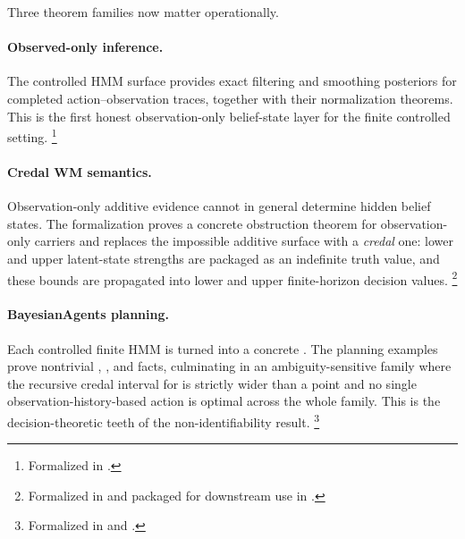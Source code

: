 \documentclass[11pt,openany]{report}
\begin{document}
Three theorem families now matter operationally.

\paragraph{Observed-only inference.}
The controlled HMM surface provides exact filtering and smoothing
posteriors for completed action--observation traces, together with
their normalization theorems.  This is the first honest
observation-only belief-state layer for the finite controlled setting.%
\footnote{Formalized in
.}

\paragraph{Credal WM semantics.}
Observation-only additive evidence cannot in general determine hidden
belief states.  The formalization proves a concrete obstruction theorem
for observation-only carriers and replaces the impossible additive
surface with a \emph{credal} one: lower and upper latent-state
strengths are packaged as an indefinite truth value, and these bounds
are propagated into lower and upper finite-horizon decision values.%
\footnote{Formalized in
and packaged for downstream use in
.}

\paragraph{BayesianAgents planning.}
Each controlled finite HMM is turned into a concrete
.  The planning examples prove
nontrivial , , and
 facts, culminating in an ambiguity-sensitive
family where the recursive credal interval for  is
strictly wider than a point and no single observation-history-based
action is optimal across the whole family.  This is the decision-theoretic
teeth of the non-identifiability result.%
\footnote{Formalized in
and
.}
\end{document}
